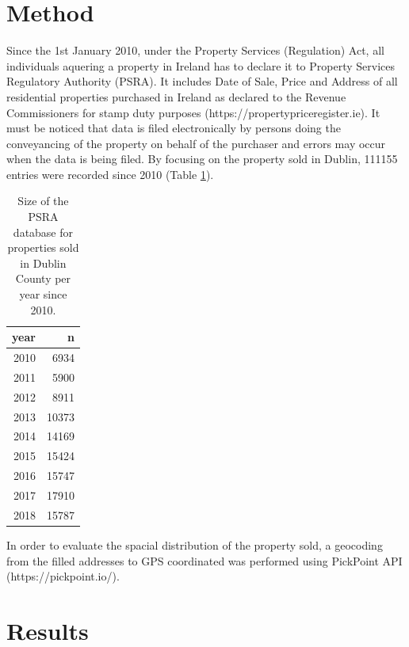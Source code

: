 \documentclass[]{elsarticle} %
\begin{document}
\section{Method}\label{method}

Since the 1st January 2010, under the Property Services (Regulation)
Act, all individuals aquering a property in Ireland has to declare it to
Property Services Regulatory Authority (PSRA). It includes Date of Sale,
Price and Address of all residential properties purchased in Ireland as
declared to the Revenue Commissioners for stamp duty purposes
(https://propertypriceregister.ie). It must be noticed that data is
filed electronically by persons doing the conveyancing of the property
on behalf of the purchaser and errors may occur when the data is being
filed. By focusing on the property sold in Dublin, 111155 entries were
recorded since 2010 (Table \ref{tab:dublin-sample-size}).

\begin{table}[!h]

\caption{\label{tab:dublin-sample-size}Size of the PSRA database for properties sold in Dublin County per year since 2010.}
\centering
\fontsize{8}{10}\selectfont
\begin{tabular}[t]{rr}
\toprule
year & n\\
\midrule
2010 & 6934\\
2011 & 5900\\
2012 & 8911\\
2013 & 10373\\
2014 & 14169\\
2015 & 15424\\
2016 & 15747\\
2017 & 17910\\
2018 & 15787\\
\bottomrule
\end{tabular}
\end{table}

In order to evaluate the spacial distribution of the property sold, a
geocoding from the filled addresses to GPS coordinated was performed
using PickPoint API (https://pickpoint.io/).

\section{Results}\label{results}
\end{document}
